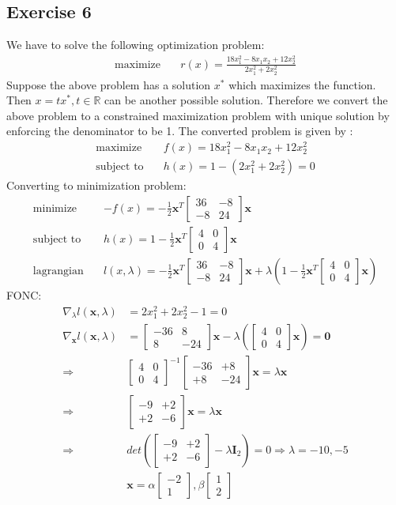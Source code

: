 \documentclass[a4paper,11pt]{article}
\newcommand{\V}[1]{\boldsymbol{#1}}
\newcommand{\mat}[1]{\begin{bmatrix}#1\end{bmatrix}}
\begin{document}
\subsection*{Exercise 6} 
We have to solve the following optimization problem:
\begin{align*}
	\text{maximize} \quad& r(x) = \frac{18x_1^2 - 8x_1x_2 +12x_2^2}{2x_1^2 + 2x_2^2}
\end{align*}
Suppose the above problem has a solution $x^*$ which maximizes the function. Then $x = tx^*, t\in \mathbb{R}$ can be another possible solution. Therefore we convert the above problem to a constrained maximization problem with unique solution by enforcing the denominator to be 1. The converted problem is given by :
\begin{align*}
 \text{maximize} \quad& f(x) = 18x_1^2 - 8x_1x_2 +12x_2^2\\
	\text{subject to} \quad& h(x)= 1 - (2x_1^2 + 2x_2^2) = 0
\end{align*}
Converting to minimization problem:
\begin{align*}
 \text{minimize} \quad& -f(x) = -\frac{1}{2}\V{x}^T\mat{36& -8\\-8& 24}\V{x}\\
 \text{subject to} \quad& h(x)= 1 - \frac{1}{2}\V{x}^T\mat{4&0\\0&4}\V{x}\\
 \text{lagrangian}\quad& l(x,\lambda) = -\frac{1}{2}\V{x}^T\mat{36& -8\\-8& 24}\V{x} + \lambda(1 - \frac{1}{2}\V{x}^T\mat{4&0\\0&4}\V{x})
\end{align*}
FONC:
\begin{align*}
 \nabla_{\lambda} l(\V{x},\lambda)&= 2x_1^2 + 2x_2^2-1 = 0\\
 \nabla_{\V{x}} l(\V{x},\lambda) &= 
 \mat{-36& 8\\8& -24}\V{x} - \lambda(\mat{4&0\\0&4}\V{x})=\V{0}\\
 \Rightarrow& \mat{4&0\\0&4}^{-1}\mat{-36& +8\\+8& -24}\V{x} = \lambda\V{x}\\
 \Rightarrow& \mat{-9& +2\\+2& -6}\V{x} = \lambda\V{x}\\
 \Rightarrow& det(\mat{-9& +2\\+2& -6}-\lambda \V{I}_2) = 0
 \Rightarrow \lambda = -10,-5\\ 
 & \V{x} = \alpha\mat{-2\\1}, \beta\mat{1\\2}\\
\end{align*}
\end{document}
